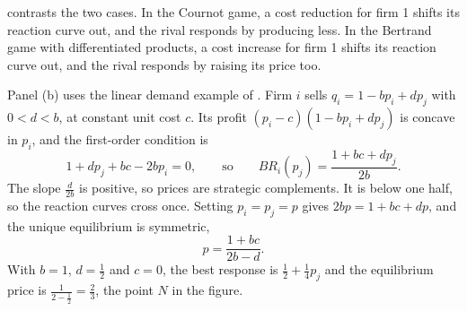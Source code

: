  contrasts the two cases. In the Cournot game, a cost reduction for firm 1 shifts its
reaction curve out, and the rival responds by producing less. In the Bertrand game with differentiated products,
a cost increase for firm 1 shifts its reaction curve out, and the rival responds by raising its price too.

Panel (b) uses the linear demand example of \citet[Section~11.2]{Tirole1988}. Firm $i$ sells
$q_i = 1 - bp_i + dp_j$ with $0 < d < b$, at constant unit cost $c$. Its profit $(p_i - c)(1 - bp_i + dp_j)$ is
concave in $p_i$, and the first-order condition is
\[
  1 + dp_j + bc - 2bp_i = 0, \qquad\text{so}\qquad BR_i(p_j) = \frac{1 + bc + dp_j}{2b}.
\]
The slope $\frac{d}{2b}$ is positive, so prices are strategic complements. It is below one half, so the
reaction curves cross once. Setting $p_i = p_j = p$ gives $2bp = 1 + bc + dp$, and the unique equilibrium is
symmetric,
\[
  p = \frac{1 + bc}{2b - d}.
\]
With $b = 1$, $d = \frac{1}{2}$ and $c = 0$, the best response is $\frac{1}{2} + \frac{1}{4}p_j$ and the equilibrium
price is $\frac{1}{2 - \frac{1}{2}} = \frac{2}{3}$, the point $N$ in the figure.

